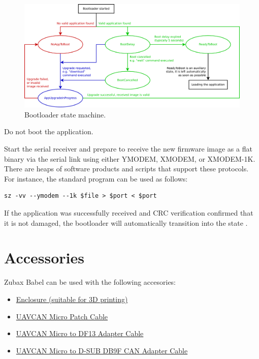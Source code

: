 \documentclass{zubaxdoc}
\begin{document}
\begin{figure}[H]
	\centerline{\includegraphics[width=1\textwidth]{bootloader_state_machine}}
	\caption{Bootloader state machine.\label{bootloader_state_machine}}
\end{figure}


Do not boot the application.


Start the serial receiver and prepare to receive the new firmware image as a flat binary via the serial link using either YMODEM, XMODEM, or XMODEM-1K. There are heaps of software products and scripts that support these protocols. For instance, the standard program  can be used as follows:

\begin{verbatim}
sz -vv --ymodem --1k $file > $port < $port
\end{verbatim}

If the application was successfully received and CRC verification confirmed that it is not damaged, the bootloader will automatically transition into the state .

\iffalse

\chapter{Accessories}

Zubax Babel can be used with the following accesories:
\begin{itemize}
\item \href{https://github.com/Zubax/zubax_babel/tree/master/hardware/enclosure}{Enclosure (suitable for 3D printing)}
\item \href{https://docs.zubax.com/uavcan#UAVCAN_Micro_Patch_Cable}{UAVCAN Micro Patch Cable}
\item \href{https://docs.zubax.com/uavcan#UAVCAN_Micro_to_DF13_Adapter_Cable}{UAVCAN Micro to DF13 Adapter Cable}
\item \href{https://docs.zubax.com/zubax_babel#UAVCAN_Micro_to_D-SUB_DB9F_CAN_Adapter_Cable}{UAVCAN Micro to D-SUB DB9F CAN Adapter Cable}
\end{itemize}
\end{document}
